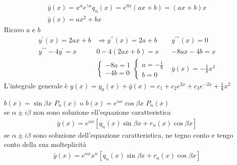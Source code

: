 \begin{eqnarray*}
	\bar{y}(x)=x^ne^{\gamma x} q_n(x)=e^{0 x}(ax+b)=(ax+b)x\\
	\bar{y}(x)=ax^2+bx
\end{eqnarray*}
Ricavo $a$ e $b$
\begin{eqnarray*}
	y^\prime(x)=2ax+b &\Rightarrow y^{\prime\prime}(x)=2a+b &
	y^{\prime\prime\prime}(x)=0\\
	y^{\prime\prime\prime}-4y^\prime=x & 0-4(2ax+b)=x & -8ax-4b=x\\
	&\begin{cases}
		-8a=1\\
		-4b=0
	\end{cases}\begin{cases}
		a=-\frac{1}{8}\\
		b=0
	\end{cases} & \bar{y}(x)=-\frac{1}{8}x^3
\end{eqnarray*}
L'integrale generale è
$y(x)=y_0(x)+\bar{y}(x)=c_1+c_2e^{2x}+c_3e^{-2x}+\frac{1}{8}x^2$
\begin{center}
	\fbox
	{
	\begin{minipage}{0.95\textwidth}
		$b(x)=\sin \beta x$ $P_n(x)$ o $b(x)=e^{\alpha x}\cos \beta x$ 
		$P_n(x)$\\
		se $\alpha\pm i\beta$ non sono soluzione ell'equazione caratteristica
		\begin{eqnarray*}
			\bar{y}(x)=e^{\alpha x}[q_n(x)\sin \beta x +r_n(x)\cos\beta x]
		\end{eqnarray*}
		se $\alpha\pm i\beta$ sono soluzione dell'equazione caratteristica, ne
		tegno conto e tengo conto della sua molteplicità
		\begin{eqnarray*}
			\bar{y}(x)=e^{\alpha x}x^n[q_n(x)\sin \beta x +r_n(x)\cos\beta x]
		\end{eqnarray*}
	\end{minipage}
	}
\end{center}

